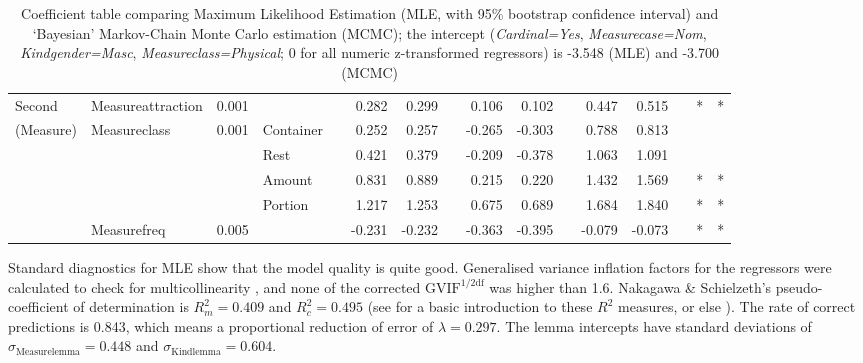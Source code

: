 \documentclass[USenglish]{article}
\begin{document}
\begin{table}
{\begin{tabular}{llrlp{0.5em}rrp{0.5em}rrp{0.5em}rrp{0.5em}cc}
       Second    & Measureattraction &  0.001 &           &&  0.282 &  0.299 &&  0.106 &  0.102 &&  0.447 &  0.515 && * & * \\
       (Measure) & Measureclass      &  0.001 & Container &&  0.252 &  0.257 && -0.265 & -0.303 &&  0.788 &  0.813 &&   &   \\
                 &                   &        & Rest      &&  0.421 &  0.379 && -0.209 & -0.378 &&  1.063 &  1.091 &&   &   \\
                 &                   &        & Amount    &&  0.831 &  0.889 &&  0.215 &  0.220 &&  1.432 &  1.569 && * & * \\
                 &                   &        & Portion   &&  1.217 &  1.253 &&  0.675 &  0.689 &&  1.684 &  1.840 && * & * \\
                 & Measurefreq       &  0.005 &           && -0.231 & -0.232 && -0.363 & -0.395 && -0.079 & -0.073 && * & * \\

  \end{tabular}
  }
  \caption{Coefficient table comparing Maximum Likelihood Estimation (MLE, with 95\% bootstrap confidence interval) and `Bayesian' Markov-Chain Monte Carlo estimation (MCMC); the intercept (\textit{Cardinal=Yes}, \textit{Measurecase=Nom}, \textit{Kindgender=Masc}, \textit{Measureclass=Physical}; 0 for all numeric z-transformed regressors) is -3.548 (MLE) and -3.700 (MCMC)}
  \label{tab:bigtable}
\end{table}


Standard diagnostics for MLE show that the model quality is quite good.
Generalised variance inflation factors for the regressors were calculated to check for multicollinearity \citep{FoxMonette1992,ZuurEa2010}, and none of the corrected $\text{GVIF}^{1/2\text{df}}$ was higher than 1.6.
Nakagawa \& Schielzeth's pseudo-coefficient of determination is $R_m^2=0.409$ and $R^2_c=0.495$ (see \citealp{Gries2015} for a basic introduction to these $R^2$ measures, or else \citealp{NakagawaSchielzeth2013}).
The rate of correct predictions is 0.843, which means a proportional reduction of error of $\lambda=0.297$.
The lemma intercepts have standard deviations of $\sigma_{\text{Measurelemma}}=0.448$ and $\sigma_{\text{Kindlemma}}=0.604$.
\end{document}
